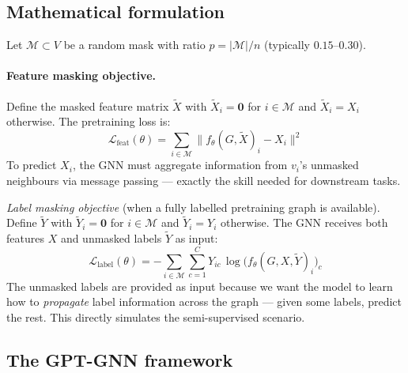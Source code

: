 \begin{notechapter}
\subsection{Mathematical formulation}

Let $\mathcal{M} \subset V$ be a random mask with ratio
$p = |\mathcal{M}|/n$ (typically $0.15$--$0.30$).

\paragraph{Feature masking objective.} Define the masked feature matrix
$\tilde{X}$ with $\tilde{X}_i = \mathbf{0}$ for $i \in \mathcal{M}$ and
$\tilde{X}_i = X_i$ otherwise. The pretraining loss is:
\begin{equation}
\label{semi-supervised-graphs:eq:feature_mask}
\mathcal{L}_{\text{feat}}(\theta) = \sum_{i \in \mathcal{M}}
  \|f_\theta(G, \tilde{X})_i - X_i\|^2
\end{equation}
To predict $X_i$, the GNN must aggregate information from $v_i$'s unmasked
neighbours via message passing --- exactly the skill needed for downstream tasks.

\emph{Label masking objective} (when a fully labelled pretraining graph is
available). Define $\tilde{Y}$ with $\tilde{Y}_i = \mathbf{0}$ for
$i \in \mathcal{M}$ and $\tilde{Y}_i = Y_i$ otherwise. The GNN receives
both features $X$ and unmasked labels $\tilde{Y}$ as input:
\begin{equation}
\label{semi-supervised-graphs:eq:label_mask}
\mathcal{L}_{\text{label}}(\theta) = -\sum_{i \in \mathcal{M}} \sum_{c=1}^C
  Y_{ic}\,\log\bigl(f_\theta(G, X, \tilde{Y})_i\bigr)_c
\end{equation}
The unmasked labels are provided as input because we want the model to learn
how to \emph{propagate} label information across the graph --- given some labels,
predict the rest. This directly simulates the semi-supervised scenario.

\subsection{The GPT-GNN framework}


\end{notechapter}
